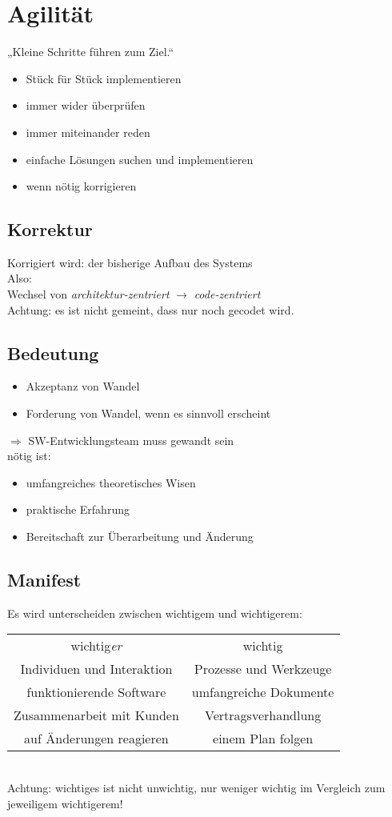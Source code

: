 \documentclass{scrreprt}
\begin{document}
\section{Agilität}
„Kleine Schritte führen zum Ziel.“
\begin{itemize}
\item Stück für Stück implementieren
\item immer wider überprüfen
\item immer miteinander reden
\item einfache Lösungen suchen und implementieren
\item wenn nötig korrigieren
\end{itemize}
\subsection{Korrektur}
Korrigiert wird: der bisherige Aufbau des Systems\\
Also:\\
Wechsel von \emph{architektur-zentriert} $\to$ \emph{code-zentriert}\\
Achtung: es ist nicht gemeint, dass nur noch gecodet wird.

\subsection{Bedeutung}
\begin{itemize}
\item Akzeptanz von Wandel
\item Forderung von Wandel, wenn es sinnvoll erscheint
\end{itemize}
$\Rightarrow$ SW-Entwicklungsteam muss gewandt sein\\
nötig ist:
\begin{itemize}
\item umfangreiches theoretisches Wisen
\item praktische Erfahrung
\item Bereitschaft zur Überarbeitung und Änderung
\end{itemize}


\subsection{Manifest}
Es wird unterscheiden zwischen wichtigem und wichtigerem:\\
\begin{tabular}{c c}
wichtig\emph{er} & wichtig\\
Individuen und Interaktion & Prozesse und Werkzeuge\\
funktionierende Software & umfangreiche Dokumente\\
Zusammenarbeit mit Kunden & Vertragsverhandlung\\
auf Änderungen reagieren & einem Plan folgen
\end{tabular}\\
Achtung: wichtiges ist nicht unwichtig, nur weniger wichtig im Vergleich zum jeweiligem wichtigerem!
\end{document}
